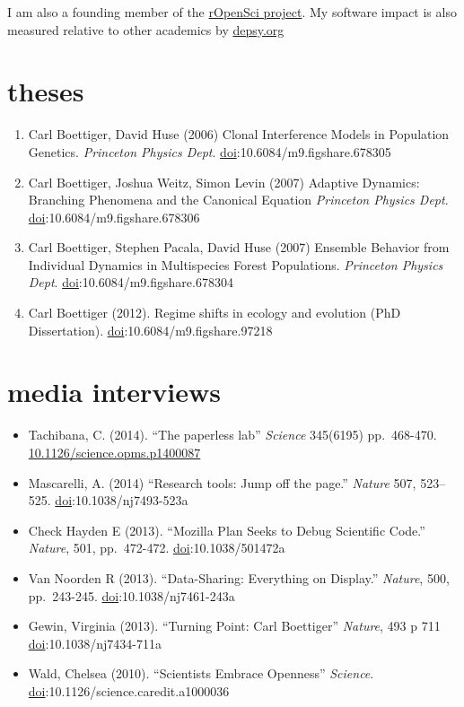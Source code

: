 \documentclass[11pt,a4paper,sans]{moderncv}        %
\makeatletter
\providecommand{\tightlist}{%
    \setlength{\itemsep}{0pt}\setlength{\parskip}{0pt}}
\renewcommand{\labelenumi}{\@biblabel{\theenumi}} %
\makeatother
\begin{document}
I am also a founding member of the \href{http://ropensci.org}{rOpenSci
project}. My software impact is also measured relative to other
academics by \href{http://depsy.org/person/329935}{depsy.org}

\section{theses}\label{theses}

\begin{enumerate}
\def\labelenumi{\arabic{enumi}.}
\item
  Carl Boettiger, David Huse (2006) Clonal Interference Models in
  Population Genetics. \emph{Princeton Physics Dept}.
  \href{http://dx.doi.org/10.6084/m9.figshare.678305}{doi}:10.6084/m9.figshare.678305
\item
  Carl Boettiger, Joshua Weitz, Simon Levin (2007) Adaptive Dynamics:
  Branching Phenomena and the Canonical Equation \emph{Princeton Physics
  Dept}.
  \href{http://dx.doi.org/10.6084/m9.figshare.678306}{doi}:10.6084/m9.figshare.678306
\item
  Carl Boettiger, Stephen Pacala, David Huse (2007) Ensemble Behavior
  from Individual Dynamics in Multispecies Forest Populations.
  \emph{Princeton Physics Dept}.
  \href{http://dx.doi.org/10.6084/m9.figshare.678304}{doi}:10.6084/m9.figshare.678304
\item
  Carl Boettiger (2012). Regime shifts in ecology and evolution (PhD
  Dissertation).
  \href{http://dx.doi.org/10.6084/m9.figshare.97218}{doi}:10.6084/m9.figshare.97218
\end{enumerate}

\section{media interviews}\label{media-interviews}

\begin{itemize}
\tightlist
\item
  Tachibana, C. (2014). ``The paperless lab'' \emph{Science} 345(6195)
  pp.~468-470.
  \href{http://www.sciencemag.org/site/products/lst_20140613.xhtml}{10.1126/science.opms.p1400087}
\item
  Mascarelli, A. (2014) ``Research tools: Jump off the page.''
  \emph{Nature} 507, 523--525.
  \href{http://dx.doi.org/10.1038/nj7493-523a}{doi}:10.1038/nj7493-523a
\item
  Check Hayden E (2013). ``Mozilla Plan Seeks to Debug Scientific
  Code.'' \emph{Nature}, 501, pp.~472-472.
  \href{http://dx.doi.org/10.1038/501472a}{doi}:10.1038/501472a
\item
  Van Noorden R (2013). ``Data-Sharing: Everything on Display.''
  \emph{Nature}, 500, pp.~243-245.
  \href{http://dx.doi.org/10.1038/nj7461-243a}{doi}:10.1038/nj7461-243a
\item
  Gewin, Virginia (2013). ``Turning Point: Carl Boettiger''
  \emph{Nature}, 493 p 711
  \href{http://dx.doi.org/10.1038/nj7434-711a}{doi}:10.1038/nj7434-711a
\item
  Wald, Chelsea (2010). ``Scientists Embrace Openness'' \emph{Science}.
  \href{http://dx.doi.org/10.1126/science.caredit.a1000036}{doi}:10.1126/science.caredit.a1000036
\end{itemize}
\end{document}
